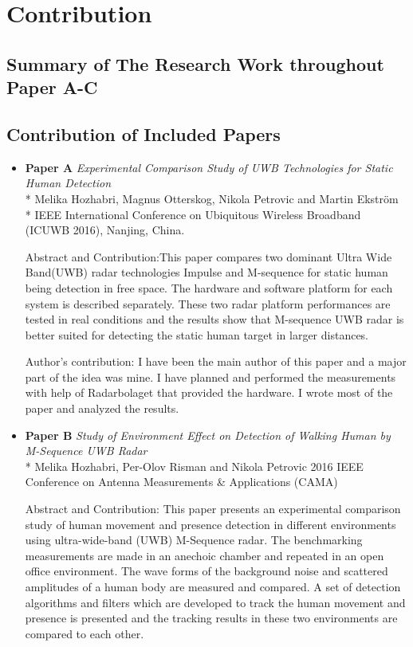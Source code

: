 \chapter{Contribution}
\section{Summary of The Research Work throughout Paper A-C}
\section{Contribution of Included Papers}
\label{papers}
\begin{itemize}
	\item \textbf{Paper A} \textit{Experimental Comparison Study of UWB Technologies for Static Human Detection}\\*
	Melika Hozhabri, Magnus Otterskog, Nikola Petrovic and Martin Ekstr\"{o}m\\*
	IEEE International Conference on Ubiquitous Wireless Broadband (ICUWB 2016), Nanjing, China.
	
	Abstract and Contribution:This paper compares two dominant Ultra Wide Band(UWB) radar technologies Impulse and M-sequence for static human being detection in free space. The hardware and software platform for each system is described separately. These two radar platform performances are tested in real conditions and the results show that M-sequence UWB radar is better suited for detecting the static human target in larger distances.
	
	Author's contribution:
	I have been the main author of this paper and a major part of the idea was mine. I have planned and performed the measurements with help of Radarbolaget that provided the hardware. I wrote most of the paper and analyzed the results.
	
	\item \textbf{Paper B} \textit{Study of Environment Effect on Detection of
		Walking Human by M-Sequence UWB Radar }\\*
		Melika Hozhabri, Per-Olov Risman and Nikola Petrovic
		2016 IEEE Conference on Antenna Measurements \& Applications (CAMA)
		
	Abstract and Contribution: This paper presents an experimental comparison study of human movement and presence detection in different environments using ultra-wide-band (UWB) M-Sequence radar. The benchmarking measurements are made in an anechoic chamber and repeated in an open office environment. The wave forms of the background noise and scattered amplitudes of a human body are measured and compared. A set of detection algorithms and filters which are developed to track the human movement and presence is presented and the tracking results in these two environments are compared to each other.


\end{itemize}
